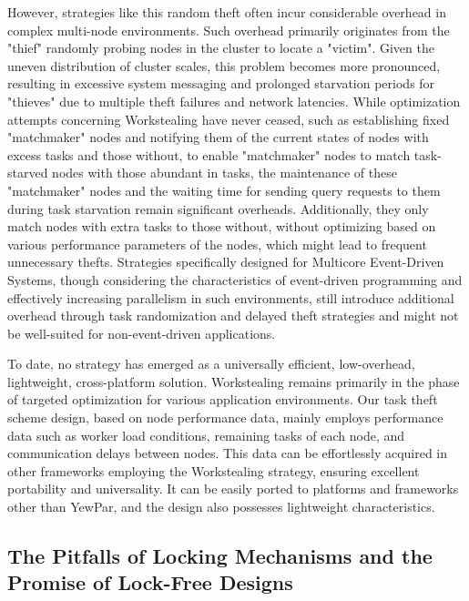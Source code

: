 \documentclass{mproj}
\begin{document}
However, strategies like this random theft often incur considerable overhead in complex multi-node environments.
Such overhead primarily originates from the "thief" randomly probing nodes in the cluster to locate a "victim".
Given the uneven distribution of cluster scales, this problem becomes more pronounced,
resulting in excessive system messaging and prolonged starvation periods for "thieves" due to multiple theft failures and network latencies.
While optimization attempts concerning Workstealing have never ceased,
such as establishing fixed "matchmaker" nodes and notifying them of the current states of nodes with excess tasks and those without,
to enable "matchmaker" nodes to match task-starved nodes with those abundant in tasks\cite{10.1145/2851141.2851175},
the maintenance of these "matchmaker" nodes and the waiting time for sending query requests to them during task starvation remain significant overheads.
Additionally, they only match nodes with extra tasks to those without,
without optimizing based on various performance parameters of the nodes,
which might lead to frequent unnecessary thefts.
Strategies specifically designed for Multicore Event-Driven Systems\cite{5541655},
though considering the characteristics of event-driven programming and effectively increasing parallelism in such environments,
still introduce additional overhead through task randomization and delayed theft strategies and might not be well-suited for non-event-driven applications.

To date, no strategy has emerged as a universally efficient, low-overhead, lightweight, cross-platform solution.
Workstealing remains primarily in the phase of targeted optimization for various application environments.
Our task theft scheme design, based on node performance data, mainly employs performance data such as worker load conditions, remaining tasks of each node, and communication delays between nodes.
This data can be effortlessly acquired in other frameworks employing the Workstealing strategy,
ensuring excellent portability and universality.
It can be easily ported to platforms and frameworks other than YewPar, and the design also possesses lightweight characteristics.

\subsection{The Pitfalls of Locking Mechanisms and the Promise of Lock-Free Designs}\label{survey_lock}
\end{document}
